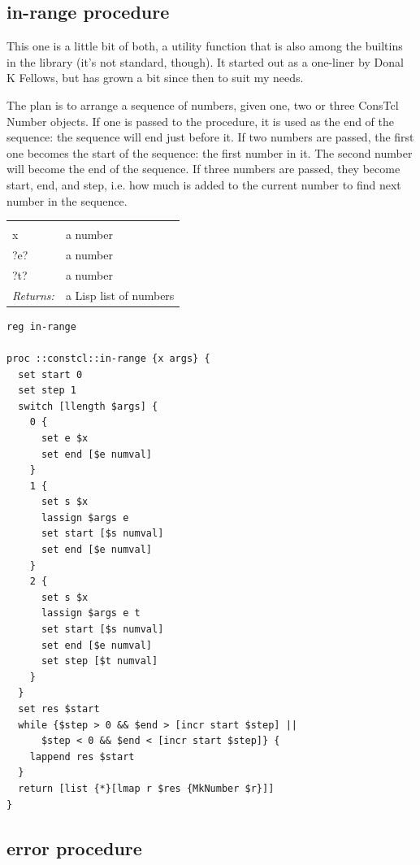 \documentclass[twoside]{report}
\begin{document}
\subsection{in-range procedure}
\label{inrange-procedure}

This one is a little bit of both, a utility function that is also among the builtins in the library (it's not standard, though). It started out as a one-liner by Donal K Fellows, but has grown a bit since then to suit my needs.

The plan is to arrange a sequence of numbers, given one, two or three ConsTcl Number objects. If one is passed to the procedure, it is used as the end of the sequence: the sequence will end just before it. If two numbers are passed, the first one becomes the start of the sequence: the first number in it. The second number will become the end of the sequence. If three numbers are passed, they become start, end, and step, i.e. how much is added to the current number to find next number in the sequence.

\noindent\begin{tabular}{ |p{1.9cm} p{8cm}| }
\hline
\rowcolor[HTML]{CCCCCC} \multicolumn{2}{|l|}{\bf in-range (public)} \\
x & a number \\
?e? & a number \\
?t? & a number \\
\textit{Returns:} & a Lisp list of numbers \\
\hline
\end{tabular}

\begin{lstlisting}
reg in-range

proc ::constcl::in-range {x args} {
  set start 0
  set step 1
  switch [llength $args] {
    0 {
      set e $x
      set end [$e numval]
    }
    1 {
      set s $x
      lassign $args e
      set start [$s numval]
      set end [$e numval]
    }
    2 {
      set s $x
      lassign $args e t
      set start [$s numval]
      set end [$e numval]
      set step [$t numval]
    }
  }
  set res $start
  while {$step > 0 && $end > [incr start $step] ||
      $step < 0 && $end < [incr start $step]} {
    lappend res $start
  }
  return [list {*}[lmap r $res {MkNumber $r}]]
}
\end{lstlisting}

\subsection{error procedure}
\label{error-procedure}
\end{document}
